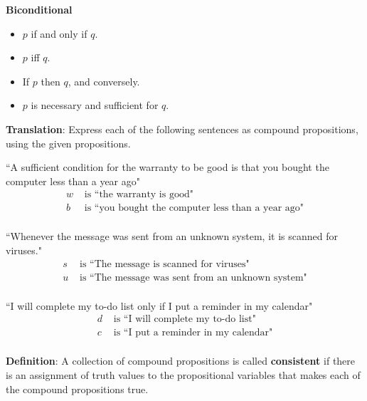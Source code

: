 \documentclass[12pt, oneside]{article}
\begin{document}
{\bf Biconditional}

\vspace{-20pt}
\begin{itemize}
    \item $p$ if and only if $q$.
    \item $p$ iff $q$.
    \item If $p$ then $q$, and conversely.
    \item $p$ is necessary and sufficient for $q$.
\end{itemize} \newpage


{\bf Translation}: Express each of the following sentences as compound propositions, using
the given propositions.

\begin{multicols}{2}
``A sufficient condition for the warranty to be good is that you bought the computer less than a year ago"
\columnbreak
\begin{align*}
w &\text{ is  ``the warranty is good"} \\
b &\text{ is  ``you bought the computer less than a year ago"} \\
\end{align*}
\end{multicols}
\vfill

\begin{multicols}{2}
``Whenever the message was sent from an unknown system, it is scanned for viruses."
\columnbreak
\begin{align*}
s &\text{ is  ``The message is scanned for viruses"} \\
u &\text{ is  ``The message was sent from an unknown system"} \\
\end{align*}
\end{multicols}
\vfill

\begin{multicols}{2}
``I will complete my to-do list only if I put a reminder in my calendar"
\columnbreak
\begin{align*}
d &\text{ is  ``I will complete my to-do list"} \\
c &\text{ is  ``I put a reminder in my calendar"} \\
\end{align*}
\end{multicols}
\vfill \newpage


{\bf Definition}: A collection of  compound  propositions
is called {\bf consistent} if  there
is  an assignment  of  truth values
to  the  propositional variables that makes
each of the compound propositions  true.
 
\end{document}
